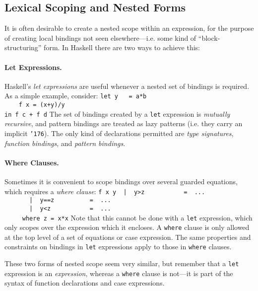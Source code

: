\subsection{Lexical Scoping and Nested Forms}
\label{tut-nesting}

It is often desirable to create a nested scope within an expression,
for the purpose of creating local bindings not seen elsewhere---i.e.
some kind of ``block-structuring'' form.  In Haskell there are two ways
to achieve this:

\paragraph*{Let Expressions.} Haskell's {\em let expressions} are
useful whenever a nested set of bindings is required.  As a simple
example, consider:
\bprog
\mbox{\tt let\ y\ \ \ =\ a*b}\\
\mbox{\tt \ \ \ \ f\ x\ =\ (x+y)/y}\\
\mbox{\tt in\ f\ c\ +\ f\ d}
\eprog 
The set of bindings created by a \mbox{\tt let} expression is {\em mutually
recursive}, and pattern bindings are treated as lazy patterns (i.e.
they carry an implicit \mbox{\tt {\char'176}}).  The only kind of declarations permitted
are {\em type signatures}, {\em function bindings}, and {\em pattern
bindings}.

\paragraph*{Where Clauses.} Sometimes it is convenient to scope
bindings over several guarded equations, which requires a {\em where
clause}:
\bprog
\mbox{\tt f\ x\ y\ \ |\ \ y>z\ \ \ \ \ \ \ \ \ \ \ =\ \ ...}\\
\mbox{\tt \ \ \ \ \ \ \ |\ \ y==z\ \ \ \ \ \ \ \ \ \ =\ \ ...}\\
\mbox{\tt \ \ \ \ \ \ \ |\ \ y<z\ \ \ \ \ \ \ \ \ \ \ =\ \ ...}\\
\mbox{\tt \ \ \ \ \ where\ z\ =\ x*x}
\eprog 
Note that this cannot be done with a \mbox{\tt let} expression, which only
scopes over the expression which it encloses.  A \mbox{\tt where} clause is
only allowed at the top level of a set of equations or case
expression.  The same properties and constraints on bindings in \mbox{\tt let}
expressions apply to those in \mbox{\tt where} clauses.

These two forms of nested scope seem very similar, but remember that a
\mbox{\tt let} expression is an {\em expression}, whereas a \mbox{\tt where} clause is
not---it is part of the syntax of function declarations and case
expressions.

